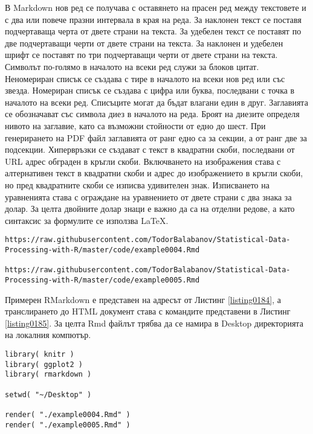 В Markdown нов ред се получава с оставянето на прасен ред между текстовете и с два или повече празни интервала в края на реда. За наклонен текст се поставя подчертаваща черта от двете страни на текста. За удебелен текст се поставят по две подчертаващи черти от двете страни на текста. За наклонен и удебелен шрифт се поставят по три подчертаващи черти от двете страни на текста. Символът по-голямо в началото на всеки ред служи за блоков цитат. Неномериран списък се създава с тире в началото на всеки нов ред или със звезда. Номериран списък се създава с цифра или буква, последвани с точка в началото на всеки ред. Списъците могат да бъдат влагани един в друг. Заглавията се обозначават със символа диез в началото на реда. Броят на диезите определя нивото на заглавие, като са възможни стойности от едно до шест. При генерирането на PDF файл заглавията от ранг едно са за секции, а от ранг две за подсекции. Хипервръзки се създават с текст в квадратни скоби, последвани от URL адрес обграден в кръгли скоби. Включването на изображения става с алтернативен текст в квадратни скоби и адрес до изображението в кръгли скоби, но пред квадратните скоби се изписва удивителен знак. Изписването на уравненията става с ограждане на уравнението от двете страни с два знака за долар. За целта двойните долар знаци е важно да са на отделни редове, а като синтаксис за формулите се използва LaTeX. 


\begin{lstlisting}[caption=Адрес на примерни RMarkdown документ, label=listing0184]
https://raw.githubusercontent.com/TodorBalabanov/Statistical-Data-Processing-with-R/master/code/example0004.Rmd

https://raw.githubusercontent.com/TodorBalabanov/Statistical-Data-Processing-with-R/master/code/example0005.Rmd
\end{lstlisting}

Примерен RMarkdown е представен на адресът от Листинг \ref{listing0184}, а транслирането до HTML документ става с командите представени в Листинг \ref{listing0185}. За целта Rmd файлът трябва да се намира в Desktop директорията на локалния компютър. 

\begin{lstlisting}[caption=Транслиране от RMarkdown в HTML и PDF, label=listing0185]
library( knitr )
library( ggplot2 )
library( rmarkdown )

setwd( "~/Desktop" )

render( "./example0004.Rmd" )
render( "./example0005.Rmd" )
\end{lstlisting}

